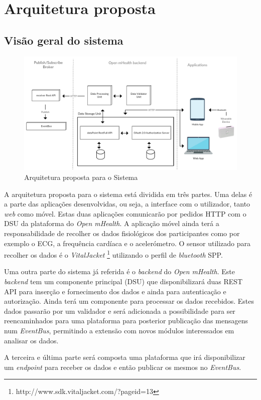 \chapter{Arquitetura proposta}

\section{Visão geral do sistema}

\begin{figure}[H]
  \centering
  \includegraphics[width=1\textwidth]{imgs/arch-product.png}
  \caption[Arquitetura proposta para o Sistema]{Arquitetura proposta para o Sistema}
  
  \label{f:product-arch}
\end{figure}

A arquitetura proposta para o sistema está dividida em três partes. Uma delas é a parte das aplicações desenvolvidas, ou seja, a interface com o utilizador, tanto \textit{web} como móvel. Estas duas aplicações comunicarão por pedidos \gls{HTTP} com o \gls{DSU} da plataforma do \textit{Open mHealth}. A aplicação móvel ainda terá a responsabilidade de recolher os dados fisiológicos dos participantes como por exemplo o \gls{ECG}, a frequência cardíaca e o acelerómetro. O sensor utilizado para recolher os dados é o \textit{VitalJacket} \footnote{http://www.sdk.vitaljacket.com/?pageid=13} utilizando o perfil de \textit{bluetooth} \gls{SPP}.
\par 
Uma outra parte do sistema já referida é o \textit{backend} do \textit{Open mHealth}. Este \textit{backend} tem um componente principal (\gls{DSU}) que disponibilizará duas \gls{REST} \gls{API} para inserção e fornecimento dos dados e ainda para autenticação e autorização. Ainda terá um componente para processar os dados recebidos. Estes dados passarão por um validador e será adicionada a possibilidade para ser reencaminhados para uma plataforma para posterior publicação das mensagens num \textit{EventBus}, permitindo a extensão com novos módulos interessados em analisar os dados. 
\par
A terceira e última parte será composta uma plataforma que irá disponibilizar um \textit{endpoint} para receber os dados e então publicar os mesmos no \textit{EventBus}.







